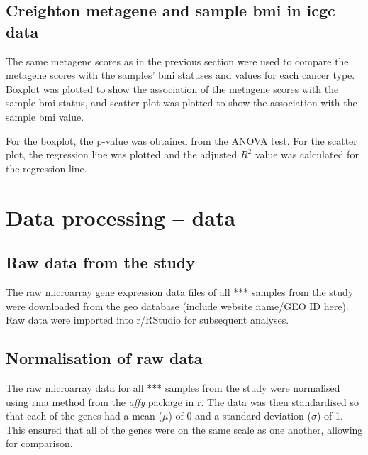 \subsection{Creighton metagene and sample \gls{bmi} in \gls{icgc} data}
\label{subsec:crmetaicgcge}

The same \gls{metagene} scores as in the previous section were used to compare the \gls{metagene} scores with the samples' \gls{bmi} statuses and values for each cancer type.
Boxplot was plotted to show the association of the \gls{metagene} scores with the sample \gls{bmi} status, and scatter plot was plotted to show the association with the sample \gls{bmi} value.

For the boxplot, the p-value was obtained from the ANOVA test.
For the scatter plot, the regression line was plotted and the adjusted $R^2$ value was calculated for the regression line.


\section{Data processing -- \citet{Fuentes-Mattei2014} data}
\label{sec:dataprocessingfm}

\subsection{Raw data from the \citet{Fuentes-Mattei2014} study}
\label{subsec:rawdatafm}

The raw microarray gene expression data files of all *** samples from the  \citet{Fuentes-Mattei2014} study were downloaded from the \gls{geo} database (include website name/GEO ID here).
Raw data were imported into \gls{r}/RStudio for subsequent analyses.


\subsection{Normalisation of raw \citet{Fuentes-Mattei2014} data}
\label{subsec:normfmdata}

The raw microarray data for all *** samples from the study were normalised using \gls{rma} method from the \textit{affy} package in \gls{r}.
The data was then standardised so that each of the genes had a mean ($\mu$) of 0 and a standard deviation ($\sigma$) of 1.
This ensured that all of the genes were on the same scale as one another, allowing for comparison.

